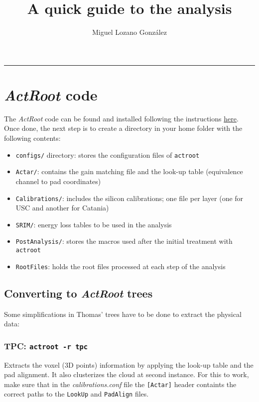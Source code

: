 \documentclass[11pt, a4paper, galician]{article}
\title{A quick guide to the analysis}
\author{Miguel Lozano González\\
	}
\date{\empty}%
\begin{document}
\begin{minipage}{0.48\linewidth}
	\maketitle
\end{minipage}\hfill
\begin{minipage}{0.48\linewidth}
	\tableofcontents
\end{minipage}

\noindent\rule{\textwidth}{1pt}

\section{\textit{ActRoot} code}
The \textit{ActRoot} code can be found and installed following the instructions \href{https://github.com/loopset/ActRootV2}{here}. Once done, the next step is to create a directory in your home folder with the following contents:
\begin{itemize}
    \item \lstinline|configs/| directory: stores the configuration files of \lstinline|actroot|
    \item \lstinline|Actar/|: contains the gain matching file and the look-up table (equivalence channel to pad coordinates)
    \item \lstinline|Calibrations/|: includes the silicon calibrations; one file per layer (one for USC and another for Catania)
    \item \lstinline|SRIM/|: energy loss tables to be used in the analysis
    \item \lstinline|PostAnalysis/|: stores the macros used after the initial treatment with \lstinline|actroot|
    \item \lstinline|RootFiles|: holds the root files processed at each step of the analysis
\end{itemize}
\subsection{Converting to \textit{ActRoot} trees}
Some simplifications in Thomas' trees have to be done to extract the physical data:
\subsubsection*{TPC: \lstinline|actroot -r tpc|}
Extracts the voxel (3D points) information by applying the look-up table and the pad alignment. It also clusterizes the cloud at second instance.
For this to work, make sure that in the \textit{calibrations.conf} file the \lstinline|[Actar]| header containts the correct paths to the \lstinline|LookUp| and \lstinline|PadAlign| files.
\end{document}
